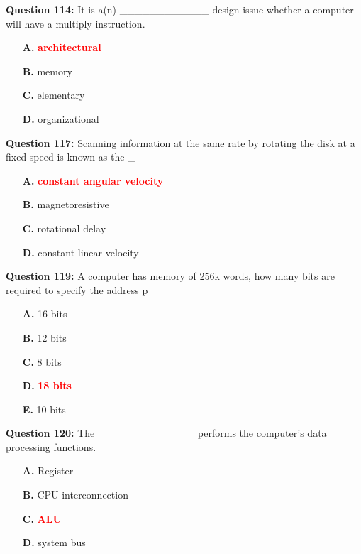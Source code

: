 \documentclass[12pt,a4paper]{article}
\begin{document}
\vspace{0.5cm}

\textbf{Question 114:} It is a(n) ____________ design issue whether a computer will have a multiply instruction.

\begin{itemize}
    \item[\textbf{A.}] \textcolor{red}{\textbf{architectural}}
    \item[\textbf{B.}] memory
    \item[\textbf{C.}] elementary
    \item[\textbf{D.}] organizational
\end{itemize}

\vspace{0.5cm}

\textbf{Question 117:} Scanning information at the same rate by rotating the disk at a fixed speed is known as the _

\begin{itemize}
    \item[\textbf{A.}] \textcolor{red}{\textbf{constant angular velocity}}
    \item[\textbf{B.}] magnetoresistive
    \item[\textbf{C.}] rotational delay
    \item[\textbf{D.}] constant linear velocity
\end{itemize}

\vspace{0.5cm}

\textbf{Question 119:} A computer has memory of 256k words, how many bits are required to specify the address p

\begin{itemize}
    \item[\textbf{A.}] 16 bits
    \item[\textbf{B.}] 12 bits
    \item[\textbf{C.}] 8 bits
    \item[\textbf{D.}] \textcolor{red}{\textbf{18 bits}}
    \item[\textbf{E.}] 10 bits
\end{itemize}

\vspace{0.5cm}

\textbf{Question 120:} The _____________ performs the computer's data processing functions.

\begin{itemize}
    \item[\textbf{A.}] Register
    \item[\textbf{B.}] CPU interconnection
    \item[\textbf{C.}] \textcolor{red}{\textbf{ALU}}
    \item[\textbf{D.}] system bus
\end{itemize}
\end{document}
